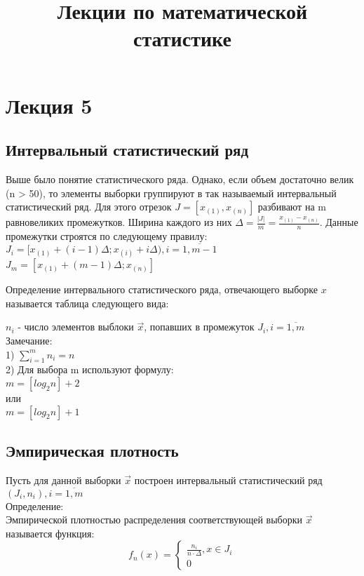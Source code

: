 \title{Лекции по математической статистике}
\chapter{Лекция 5}
\section{Интервальный статистический ряд}
Выше было понятие статистического ряда. Однако, если объем достаточно велик (n > 50), то элементы выборки группируют в так называемый интервальный статистический ряд. Для этого отрезок $J = [x_{(1)}, x_{(n)}]$ разбивают на m равновеликих промежутков. Ширина каждого из них $\Delta = \frac{|J|}{m} = \frac{x_{(1)} - x_{(n)}}{n}$. Данные промежутки строятся по следующему правилу:\\
$J_{i} = [x_{(1)} + (i - 1)\Delta; x_{(i)} + i\Delta), i=\overline{1, m-1}$\\
$J_{m} = [x_{(1)} + (m - 1)\Delta; x_{(n)}]$\\
\begin{figure}[H]
	\center{\texttt{[image: 5\_1]}}
\end{figure}

Определение интервального статистического ряда, отвечающего выборке $x$ называется таблица следующего вида:\\

\begin{figure}[H]
	\center{\texttt{[image: 5\_2]}}
\end{figure}

$n_{i}$ - число элементов выблоки $\overrightarrow{x}$, попавших в промежуток $J_{i}, i = \overline{1, m}$\\
Замечание:\\
1) $\sum\limits_{i = 1}^{m} n_{i} = n$\\
2) Для выбора m используют формулу:\\
$m = [log_{2}n] + 2$\\
или\\
$m = [log_{2}n] + 1$\\

\section{Эмпирическая плотность}
Пусть для данной выборки $\overrightarrow{x}$ построен интервальный статистический ряд $(J_{i}, n_{i}), i = \overline{1, m}$\\
Определение:\\
Эмпирической плотностью распределения соответствующей выборки $\overrightarrow{x}$ называется функция:\\
\begin{equation}
f_{n}(x) = 
\begin{cases}
\frac{n_{i}}{n \cdot \Delta}, x \in J_{i}\\
0
\end{cases}
\end{equation}


